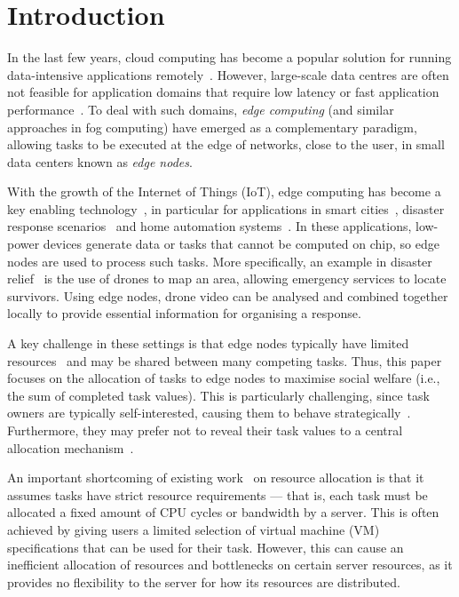 \section{Introduction}
\label{sec:introduction}
In the last few years, cloud computing has become a popular solution for running data-intensive applications remotely~\cite{cloud_cite}. However, large-scale data centres are often not feasible for application domains that require low latency or fast application performance~\cite{mobile_edge_IoT}. To deal with such domains, \emph{edge computing} (and similar approaches in fog computing) have emerged as a complementary paradigm, allowing tasks to be executed at the edge of networks, close to the user, in small data centers known as \emph{edge nodes}.

With the growth of the Internet of Things (IoT), edge computing has become a key enabling technology~\cite{mobile_edge_IoT, edge_computing_iot}, in particular for applications in smart cities~\cite{mobile_edge_smart}, disaster response scenarios~\cite{mobile_edge_disaster, smart_disaster_management} and home automation systems~\cite{home_automations}. In these applications, low-power devices generate data or tasks that cannot be computed on  chip, so edge nodes are used to process such tasks. More specifically, an example in disaster relief~\cite{9200963} is the use of drones to map an area, allowing emergency services to locate survivors. Using edge nodes, drone video can be analysed and combined together locally to provide essential information for organising a response. 

A key challenge in these settings is that edge nodes typically have limited resources~\cite{7796149} and may be shared between many competing tasks. Thus, this paper focuses on the allocation of tasks to edge nodes to maximise social welfare (i.e., the sum of completed task values). This is particularly challenging, since task owners are typically self-interested, causing them to behave strategically~\cite{Bi2019}. Furthermore, they may prefer not to reveal their task values to a central allocation mechanism~\cite{Pai2013}.

An important shortcoming of existing work~\cite{ghobaei2019resource, 8373684, tasiopoulos2018edge, 8839780, 8379445} on resource allocation is that it assumes tasks have strict resource requirements --- that is, each task must be allocated a fixed amount of CPU cycles or bandwidth by a server. This is often achieved by giving users a limited selection of virtual machine (VM) specifications that can be used for their task. However, this can cause an inefficient allocation of resources and bottlenecks on certain server resources, as it provides no flexibility to the server for how its resources are distributed.

